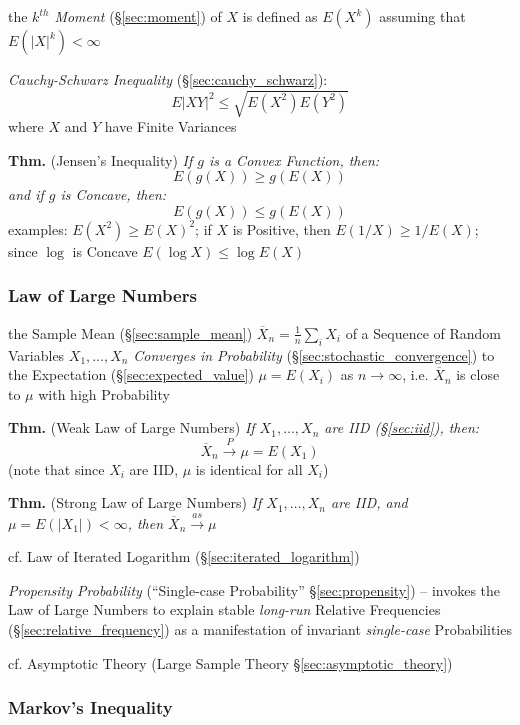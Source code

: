 the \emph{$k^{th}$ Moment} (\S\ref{sec:moment}) of $X$ is defined as $E(X^k)$
assuming that $E(|X|^k) < \infty$

\emph{Cauchy-Schwarz Inequality} (\S\ref{sec:cauchy_schwarz}):
\[
  E|XY|^2 \leq \sqrt{E(X^2)E(Y^2)}
\]
where $X$ and $Y$ have Finite Variances

\textbf{Thm.} (Jensen's Inequality) \emph{
  If $g$ is a Convex Function, then:
  \[
    E(g(X)) \geq g(E(X))
  \]
  and if $g$ is Concave, then:
  \[
    E(g(X)) \leq g(E(X))
  \]
}
examples: $E(X^2) \geq E(X)^2$; if $X$ is Positive, then $E(1/X) \geq 1/E(X)$;
since $\log$ is Concave $E(\log X) \leq \log E(X)$



\subsubsection{Law of Large Numbers}\label{sec:large_numbers}

the Sample Mean (\S\ref{sec:sample_mean})
$\overline{X}_n = \frac{1}{n}\sum_i X_i$ of a Sequence of Random Variables
$X_1, \ldots, X_n$ \emph{Converges in Probability}
(\S\ref{sec:stochastic_convergence}) to the Expectation
(\S\ref{sec:expected_value}) $\mu = E(X_i)$ as $n \to \infty$, i.e.
$\overline{X}_n$ is close to $\mu$ with high Probability

\textbf{Thm.} (Weak Law of Large Numbers) \emph{If $X_1, \ldots, X_n$ are IID
  (\S\ref{sec:iid}), then:
  \[
    \overline{X}_n \xrightarrow{P} \mu = E(X_1)
  \]
}
(note that since $X_i$ are IID, $\mu$ is identical for all $X_i$)

\textbf{Thm.} (Strong Law of Large Numbers) \emph{If $X_1, \ldots, X_n$ are IID,
  and $\mu = E(|X_1|) < \infty$, then $\overline{X}_n \xrightarrow{as} \mu$}

\fist cf. Law of Iterated Logarithm (\S\ref{sec:iterated_logarithm})

\fist \emph{Propensity Probability} (``Single-case Probability''
\S\ref{sec:propensity}) -- invokes the Law of Large Numbers to explain stable
\emph{long-run} Relative Frequencies (\S\ref{sec:relative_frequency}) as a
manifestation of invariant \emph{single-case} Probabilities

\fist cf. Asymptotic Theory (Large Sample Theory \S\ref{sec:asymptotic_theory})



\subsubsection{Markov's Inequality}\label{sec:markovs_inequality}

